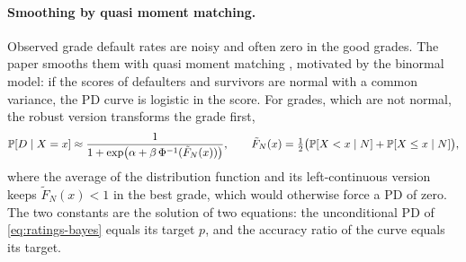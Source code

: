 \paragraph{Smoothing by quasi moment matching.} Observed grade default rates are noisy and often zero in the good grades. The paper smooths them with quasi moment matching \citep{ratings:tasche2009}, motivated by the binormal model: if the scores of defaulters and survivors are normal with a common variance, the PD curve is logistic in the score. For grades, which are not normal, the robust version transforms the grade first,
\begin{equation}
\mathbb{P}[D\mid X=x]\approx\frac{1}{1+\exp\bigl(\alpha+\beta\,\Phi^{-1}(\tilde F_N(x))\bigr)},\qquad
\tilde F_N(x)=\tfrac12\bigl(\mathbb{P}[X<x\mid N]+\mathbb{P}[X\le x\mid N]\bigr),
\label{eq:ratings-qmm}
\end{equation}
where the average of the distribution function and its left-continuous version keeps $\tilde F_N(x)<1$ in the best grade, which would otherwise force a PD of zero. The two constants are the solution of two equations: the unconditional PD of \cref{eq:ratings-bayes} equals its target $p$, and the accuracy ratio of the curve equals its target.

